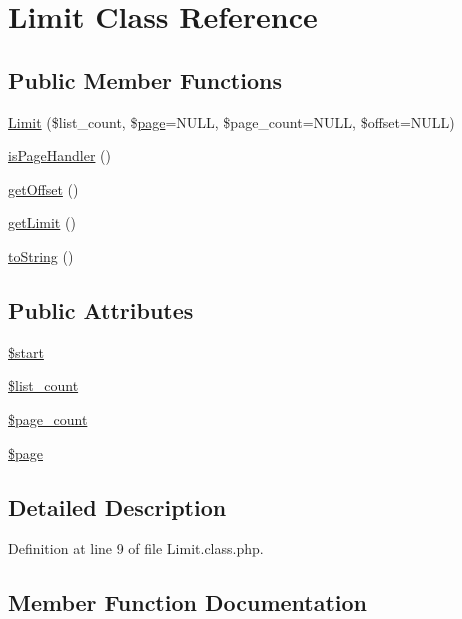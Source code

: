 \hypertarget{classLimit}{}\section{Limit Class Reference}
\label{classLimit}
\subsection*{Public Member Functions}
\begin{DoxyCompactItemize}
\item 
\hyperlink{classLimit_a3f29df69e167ae9fe5ae3f6b4adebb34}{Limit} (\$list\+\_\+count, \$\hyperlink{classpage}{page}=N\+U\+LL, \$page\+\_\+count=N\+U\+LL, \$offset=N\+U\+LL)
\item 
\hyperlink{classLimit_a3a30a3752791c509c01ee9b52e774a3c}{is\+Page\+Handler} ()
\item 
\hyperlink{classLimit_a5dfd9d778f1cfbdaee6114f707a82b48}{get\+Offset} ()
\item 
\hyperlink{classLimit_ae46603b46f8e2969e440eaa9c83e4805}{get\+Limit} ()
\item 
\hyperlink{classLimit_a890c6b7ac90174239e7b5452d4887fc0}{to\+String} ()
\end{DoxyCompactItemize}
\subsection*{Public Attributes}
\begin{DoxyCompactItemize}
\item 
\hyperlink{classLimit_a58e5f9abf39a412a992c922b3342d093}{\$start}
\item 
\hyperlink{classLimit_ada4e47bcb26e48b38e5a6eae0c66cf9c}{\$list\+\_\+count}
\item 
\hyperlink{classLimit_a4e9d12866f8d59589273aaf8e50eaccd}{\$page\+\_\+count}
\item 
\hyperlink{classLimit_a4018b14c795cefed6f16b6651ca343dc}{\$page}
\end{DoxyCompactItemize}


\subsection{Detailed Description}


Definition at line 9 of file Limit.\+class.\+php.



\subsection{Member Function Documentation}
\mbox{\label{classLimit_ae46603b46f8e2969e440eaa9c83e4805}} 
